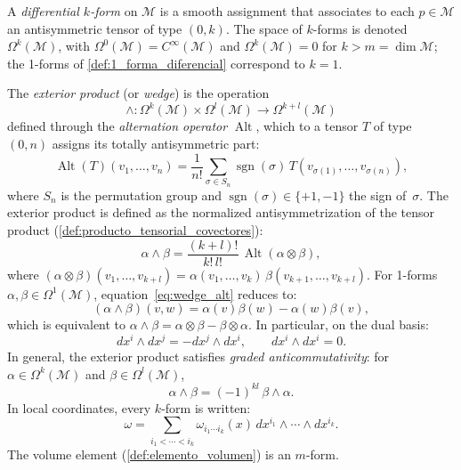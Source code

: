 \begin{definition}\label{def:producto_exterior_k_formas}
A \textit{differential $k$-form} on $\mathcal{M}$ is a smooth assignment that associates to each $p \in \mathcal{M}$ an antisymmetric tensor of type $(0, k)$. The space of $k$-forms is denoted $\Omega^k(\mathcal{M})$, with $\Omega^0(\mathcal{M}) = C^\infty(\mathcal{M})$ and $\Omega^k(\mathcal{M}) = 0$ for $k > m = \dim \mathcal{M}$; the 1-forms of \autoref{def:1_forma_diferencial} correspond to $k = 1$.

The \textit{exterior product} (or \textit{wedge}) is the operation
\[
\wedge: \Omega^k(\mathcal{M}) \times \Omega^l(\mathcal{M}) \longrightarrow \Omega^{k+l}(\mathcal{M})
\]
defined through the \textit{alternation operator} $\operatorname{Alt}$, which to a tensor $T$ of type $(0,n)$ assigns its totally antisymmetric part:
\[
\operatorname{Alt}(T)(v_1, \ldots, v_n) = \frac{1}{n!} \sum_{\sigma \in S_n} \operatorname{sgn}(\sigma)\, T(v_{\sigma(1)}, \ldots, v_{\sigma(n)}),
\]
where $S_n$ is the permutation group and $\operatorname{sgn}(\sigma) \in \{+1, -1\}$ the sign of~$\sigma$. The exterior product is defined as the normalized antisymmetrization of the tensor product (\autoref{def:producto_tensorial_covectores}):
\begin{equation}\label{eq:wedge_alt}
\alpha \wedge \beta = \frac{(k+l)!}{k!\,l!}\, \operatorname{Alt}(\alpha \otimes \beta),
\end{equation}
where $(\alpha \otimes \beta)(v_1, \ldots, v_{k+l}) = \alpha(v_1, \ldots, v_k)\,\beta(v_{k+1}, \ldots, v_{k+l})$. For 1-forms $\alpha, \beta \in \Omega^1(\mathcal{M})$, equation~\eqref{eq:wedge_alt} reduces to:
\[
(\alpha \wedge \beta)(v, w) = \alpha(v)\beta(w) - \alpha(w)\beta(v),
\]
which is equivalent to $\alpha \wedge \beta = \alpha \otimes \beta - \beta \otimes \alpha$. In particular, on the dual basis:
\[
dx^i \wedge dx^j = -dx^j \wedge dx^i, \qquad dx^i \wedge dx^i = 0.
\]
In general, the exterior product satisfies \textit{graded anticommutativity}: for $\alpha \in \Omega^k(\mathcal{M})$ and $\beta \in \Omega^l(\mathcal{M})$,
\[
\alpha \wedge \beta = (-1)^{kl}\, \beta \wedge \alpha.
\]
In local coordinates, every $k$-form is written:
\[
\omega = \sum_{i_1 < \cdots < i_k} \omega_{i_1 \cdots i_k}(x) \, dx^{i_1} \wedge \cdots \wedge dx^{i_k}.
\]
The volume element (\autoref{def:elemento_volumen}) is an $m$-form.
\end{definition}

